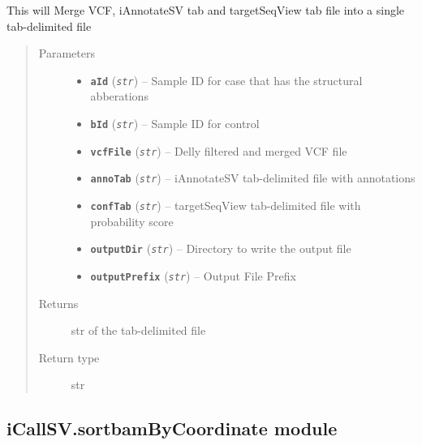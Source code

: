\documentclass[letterpaper,10pt,english]{sphinxmanual}
\begin{document}
\begin{fulllineitems}
\label{iCallSV:iCallSV.mergeFinalFiles.run}
This will Merge VCF, iAnnotateSV tab and targetSeqView tab file into a single tab-delimited file
\begin{quote}\begin{description}
\item[{Parameters}] \leavevmode\begin{itemize}
\item {} 
\textbf{\texttt{aId}} (\emph{\texttt{str}}) -- Sample ID for case that has the structural abberations

\item {} 
\textbf{\texttt{bId}} (\emph{\texttt{str}}) -- Sample ID for control

\item {} 
\textbf{\texttt{vcfFile}} (\emph{\texttt{str}}) -- Delly filtered and merged VCF file

\item {} 
\textbf{\texttt{annoTab}} (\emph{\texttt{str}}) -- iAnnotateSV tab-delimited file with annotations

\item {} 
\textbf{\texttt{confTab}} (\emph{\texttt{str}}) -- targetSeqView tab-delimited file with probability score

\item {} 
\textbf{\texttt{outputDir}} (\emph{\texttt{str}}) -- Directory to write the output file

\item {} 
\textbf{\texttt{outputPrefix}} (\emph{\texttt{str}}) -- Output File Prefix

\end{itemize}

\item[{Returns}] \leavevmode
str of the tab-delimited file

\item[{Return type}] \leavevmode
str

\end{description}\end{quote}

\end{fulllineitems}



\subsection{iCallSV.sortbamByCoordinate module}
\label{iCallSV:module-iCallSV.sortbamByCoordinate}\label{iCallSV:icallsv-sortbambycoordinate-module}
\end{document}
